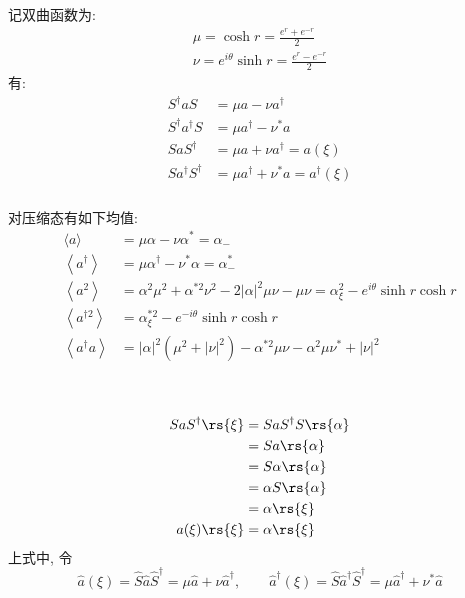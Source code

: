    \begin{frame}
    \frametitle{}
    记双曲函数为: \[ \begin{gathered}
        \mu=\cosh r=\frac{e^{r}+e^{-r}}{2} \\
        \nu=e^{i \theta} \sinh r=\frac{e^{r}-e^{-r}}{2}
        \end{gathered} \]
    有:
    \[\begin{aligned}
        S^\dagger a S &= \mu a - \nu a^{\dagger}  \\ 
        S^{\dagger} a^{\dagger} S &=\mu a^{\dagger}-\nu^{*} a \\
        S a S^{\dagger} &=\mu a+\nu a^{\dagger}  = a(\xi) \\
        S a^{\dagger} S^{\dagger} &=\mu a^{\dagger}+\nu^{*} a   = a^{\dagger} (\xi) 
        \end{aligned} \]    
   \end{frame}

   \begin{frame}
    \frametitle{}
    对压缩态有如下均值: 
       \[ \begin{aligned}
           \langle a\rangle &=\mu\alpha - \nu \alpha^{*}  = \alpha_{-}\\
           \left\langle a^{\dagger}\right\rangle &= \mu \alpha^{\dagger}-\nu^{*} \alpha = \alpha_{-} ^*\\
           \left\langle a^{2}\right\rangle &=\alpha^{2} \mu^{2}+\alpha^{* 2} \nu^{2}-2|\alpha|^{2} \mu \nu-\mu \nu =  \alpha_\xi ^{2}- e^{i\theta} \sinh r \cosh r \\
           \left\langle a^{\dagger 2} \right\rangle &= \alpha_\xi ^{*2}- e^{-i\theta} \sinh r \cosh r  \\ 
           \left\langle a^{\dagger} a\right\rangle &=|\alpha|^{2}\left(\mu^{2}+|\nu|^{2}\right)-\alpha^{* 2} \mu \nu-\alpha^{2} \mu \nu^{*}+|\nu|^{2}
           \end{aligned}\]
   \end{frame}


   \begin{frame}
    \frametitle{}
    \证~  
    \[\begin{aligned}
        S a S^\dagger \rs{\xi } &= S a S^\dagger S \rs{\alpha } \\ 
        &= S a \rs{\alpha } \\ 
        &= S \alpha \rs{\alpha } \\ 
        &= \alpha  S \rs{\alpha } \\ 
        &= \alpha   \rs{\xi }  \\ 
        a(\xi) \rs{\xi } &= \alpha   \rs{\xi }
    \end{aligned} \]
    上式中, 令 \[\hat{a}(\xi)=  \hat{S} \hat{a} \hat{S}^\dagger = \mu \hat{a}+\nu \hat{a}^{\dagger} , \qquad  \hat{a}^\dagger (\xi)=  \hat{S} \hat{a}^\dagger \hat{S}^\dagger =\mu \hat{a}^{\dagger}+\nu^{*} \hat{a} \]
   \end{frame}

